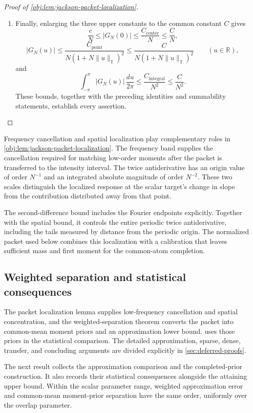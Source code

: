 \documentclass[11pt]{article}
\begin{document}
\begin{proof}[Proof of \cref{obj:lem:jackson-packet-localization}]
\begin{enumerate}
\item Finally, enlarging the three upper constants to the common constant \(C\) gives
\[
\frac cN\leq|G_N(0)|
\leq\frac{C_{\mathrm{center}}}N
\leq\frac CN,
\]
\[
|G_N(u)|
\leq
\frac{C_{\mathrm{point}}}
 {N(1+N\|u\|_{\mathbb T})^2}
\leq
\frac C{N(1+N\|u\|_{\mathbb T})^2}
\qquad(u\in\mathbb R),
\]
and
\[
\int_{-\pi}^{\pi}|G_N(u)|\,\frac{du}{2\pi}
\leq\frac{C_{\mathrm{integral}}}{N^2}
\leq\frac C{N^2}.
\]
These bounds, together with the preceding identities and summability statements, establish every assertion.
\end{enumerate}
\end{proof}

Frequency cancellation and spatial localization play complementary roles in \cref{obj:lem:jackson-packet-localization}. The frequency band supplies the cancellation required for matching low-order moments after the packet is transferred to the intensity interval. The twice antiderivative has an origin value of order \(N^{-1}\) and an integrated absolute magnitude of order \(N^{-2}\). These two scales distinguish the localized response at the scalar target's change in slope from the contribution distributed away from that point.

The second-difference bound includes the Fourier endpoints explicitly. Together with the spatial bound, it controls the entire periodic twice antiderivative, including the tails measured by distance from the periodic origin. The normalized packet used below combines this localization with a calibration that leaves sufficient mass and first moment for the common-atom completion.

\subsection{Weighted separation and statistical consequences}

The packet localization lemma supplies low-frequency cancellation and spatial concentration, and the weighted-separation theorem converts the packet into common-mean moment priors and an approximation lower bound.  uses those priors in the statistical comparison. The detailed approximation, sparse, dense, transfer, and concluding arguments are divided explicitly in \cref{sec:deferred-proofs}.

The next result collects the approximation comparison and the completed-prior construction. It also records their statistical consequences alongside the attaining upper bound. Within the scalar parameter range, weighted approximation error and common-mean moment-prior separation have the same order, uniformly over the overlap parameter.
\end{document}
